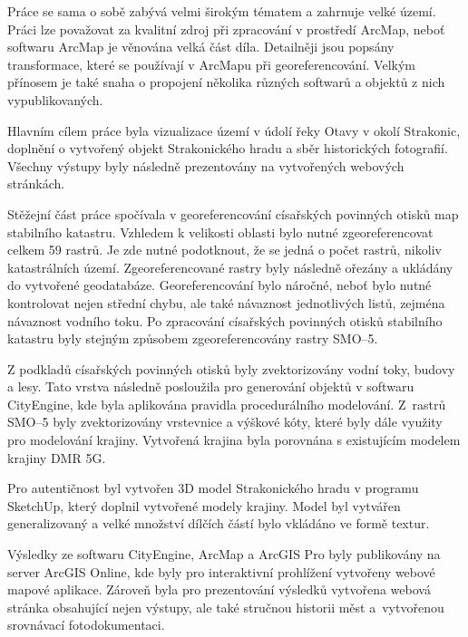 \documentclass[thesis=M,czech]{FITthesis}[2012/06/26]
\begin{document}
Práce se sama o sobě zabývá velmi širokým tématem a zahrnuje velké území. Práci lze považovat za kvalitní zdroj při zpracování v prostředí ArcMap, neboť softwaru ArcMap je věnována velká část díla. Detailněji jsou popsány transformace, které se používají v ArcMapu při georeferencování. Velkým přínosem je také snaha o propojení několika různých softwarů a objektů z nich vypublikovaných.





\begin{conclusion}
Hlavním cílem práce byla vizualizace území v údolí řeky Otavy v okolí Strakonic, doplnění o vytvořený objekt Strakonického hradu a sběr historických fotografií. Všechny výstupy byly následně prezentovány na vytvořených webových stránkách.

Stěžejní část práce spočívala v georeferencování císařských povinných otisků map stabilního katastru. Vzhledem k velikosti oblasti bylo nutné zgeoreferencovat celkem 59 rastrů. Je zde nutné podotknout, že se jedná o počet rastrů, nikoliv katastrálních území. Zgeoreferencované rastry byly následně ořezány a ukládány do vytvořené geodatabáze. Georeferencování bylo náročné, neboť bylo nutné kontrolovat nejen střední chybu, ale také návaznost jednotlivých listů, zejména návaznost vodního toku. Po zpracování císařských povinných otisků stabilního katastru byly stejným způsobem zgeoreferencovány rastry SMO–5. 

Z podkladů císařských povinných otisků byly zvektorizovány vodní toky, budovy a lesy. Tato vrstva následně posloužila pro generování objektů v softwaru CityEngine, kde byla aplikována pravidla procedurálního modelování. Z~rastrů SMO–5 byly zvektorizovány vrstevnice a výškové kóty, které byly dále využity pro modelování krajiny. Vytvořená krajina byla porovnána s existujícím modelem krajiny DMR 5G. 

Pro autentičnost byl vytvořen 3D model Strakonického hradu v programu SketchUp, který doplnil vytvořené modely krajiny. Model byl vytvářen generalizovaný a velké množství dílčích částí bylo vkládáno ve formě textur. 

Výsledky ze softwaru CityEngine, ArcMap a ArcGIS Pro byly publikovány na server ArcGIS Online, kde byly pro interaktivní prohlížení vytvořeny webové mapové aplikace. Zároveň byla pro prezentování výsledků vytvořena webová stránka obsahující nejen výstupy, ale také stručnou historii měst a~vytvořenou srovnávací fotodokumentaci.





\end{conclusion}
\end{document}

